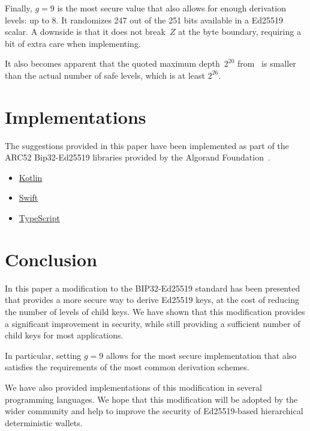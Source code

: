 \documentclass[12pt, a4paper, twocolumn]{article}
\begin{document}
Finally, $g=9$ is the most secure value that also allows for enough derivation levels: up to 8.
It randomizes 247 out of the 251 bits available in a Ed25519 scalar.
A downside is that it does not break~$Z$ at the byte boundary, requiring a bit of extra care when implementing.

It also becomes apparent that the quoted maximum depth~$2^{20}$ from~\cite{BIP32-Ed25519} is smaller than the actual number of safe levels, which is at least $2^{26}$.

\section{Implementations}


The suggestions provided in this paper have been implemented as part of the ARC52 Bip32-Ed25519 libraries provided by the Algorand Foundation~\cite{AF}.

\begin{itemize}
  \item \href{https://github.com/algorandfoundation/bip32-ed25519-kotlin}{Kotlin}
  \item \href{https://github.com/algorandfoundation/bip32-ed25519-swift}{Swift}
  \item \href{https://github.com/ehanoc/ARCs/tree/wallet-api-context/assets/arc-0052}{TypeScript}
\end{itemize}


\section{Conclusion}

In this paper a modification to the BIP32-Ed25519 standard has been presented that provides a more secure way to derive Ed25519 keys, at the cost of reducing the number of levels of child keys. We have shown that this modification provides a significant improvement in security, while still providing a sufficient number of child keys for most applications.

In particular, setting $g=9$ allows for the most secure implementation that also satisfies the requirements of the most common derivation schemes.

We have also provided implementations of this modification in several programming languages. We hope that this modification will be adopted by the wider community and help to improve the security of Ed25519-based hierarchical deterministic wallets.


\nocite{*}


\end{document}
